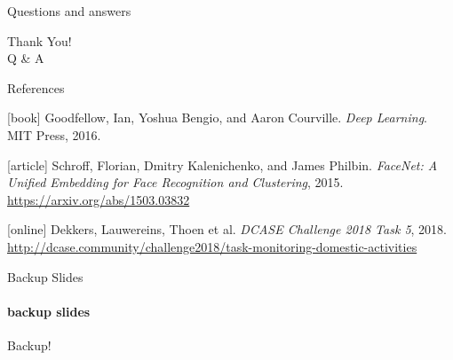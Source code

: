 \documentclass[aspectratio=169]{beamer}
\begin{document}

\begin{frame}{Questions and answers}
    \begin{center}
    {\fontsize{40}{50}\selectfont Thank You! \\[10pt] Q \& A}
    \end{center}
\end{frame}

\begin{frame}[allowframebreaks]{References}
    \begin{thebibliography}{}
        [book]
        Goodfellow, Ian, Yoshua Bengio, and Aaron Courville.
        \newblock \emph{Deep Learning}.
        \newblock MIT Press, 2016.
        
        [article]
        Schroff, Florian, Dmitry Kalenichenko, and James Philbin.
        \newblock \emph{FaceNet: A Unified Embedding for Face Recognition and Clustering}, 2015.
        \newblock \url{https://arxiv.org/abs/1503.03832}
        
        [online]
        Dekkers, Lauwereins, Thoen et al.
        \newblock \emph{DCASE Challenge 2018 Task 5}, 2018.
        \newblock \url{http://dcase.community/challenge2018/task-monitoring-domestic-activities}
    \end{thebibliography}
\end{frame}


\begin{frame}{Backup Slides}
	\framesubtitle{backup slides}
	Backup!
\end{frame}

\end{document}
